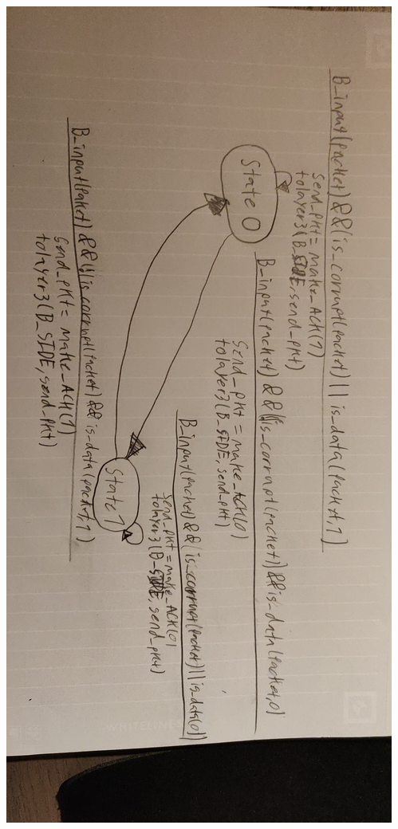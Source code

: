\begin{center}
\includegraphics[width=\linewidth]{bilder/receiver.jpg}
\label{fig:receiver}
\end{center}
